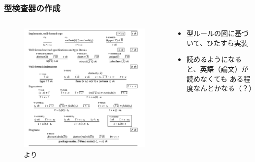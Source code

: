 \begin{frame}
  \frametitle{型検査器の作成}

  \begin{columns}
    \begin{column}{0.4\textwidth}
      \begin{figure}
        \includegraphics[width=\textwidth]{img/type_rule.png}
        \caption{\cite{griesemer2020featherweight}より}
      \end{figure}
    \end{column}
    \begin{column}{0.6\textwidth}
      \pause
      \begin{itemize}
        \item<+-> 型ルールの図に基づいて、ひたすら実装


        \item<+-> 読めるようになると、英語（論文）が読めなくても
        ある程度なんとかなる（？）

      \end{itemize}
    \end{column}
  \end{columns}
\end{frame}

